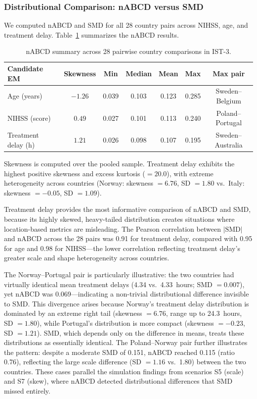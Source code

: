 \documentclass[AMA,Times1COL]{WileyNJDv5}
\begin{document}
\subsubsection{Distributional Comparison: nABCD versus SMD}\label{sec:case_b_nabcd_smd}

We computed nABCD and SMD\cite{austin2011} for all 28 country pairs across NIHSS, age, and treatment delay. Table~\ref{tab:ist3_nabcd} summarizes the nABCD results.

\begin{table}[ht]
\caption{nABCD summary across 28 pairwise country comparisons in IST-3.\label{tab:ist3_nabcd}}
\begin{tabular*}{\textwidth}{@{\extracolsep\fill}lcccccc@{}}
\toprule
\textbf{Candidate EM} & \textbf{Skewness} & \textbf{Min} & \textbf{Median} & \textbf{Mean} & \textbf{Max} & \textbf{Max pair} \\
\midrule
Age (years) & $-1.26$ & 0.039 & 0.103 & 0.123 & 0.285 & Sweden--Belgium \\
NIHSS (score) & $0.49$ & 0.027 & 0.101 & 0.113 & 0.240 & Poland--Portugal \\
Treatment delay (h) & $1.21$ & 0.026 & 0.098 & 0.107 & 0.195 & Sweden--Australia \\
\bottomrule
\end{tabular*}
\begin{tablenotes}
\item Skewness is computed over the pooled sample. Treatment delay exhibits the highest positive skewness and excess kurtosis ($= 20.0$), with extreme heterogeneity across countries (Norway: skewness $= 6.76$, SD $= 1.80$ vs.\ Italy: skewness $= -0.05$, SD $= 1.09$).
\end{tablenotes}
\end{table}

Treatment delay provides the most informative comparison of nABCD and SMD, because its highly skewed, heavy-tailed distribution creates situations where location-based metrics are misleading. The Pearson correlation between $|\text{SMD}|$ and nABCD across the 28 pairs was 0.91 for treatment delay, compared with 0.95 for age and 0.98 for NIHSS---the lower correlation reflecting treatment delay's greater scale and shape heterogeneity across countries.

The Norway--Portugal pair is particularly illustrative: the two countries had virtually identical mean treatment delays (4.34 vs.\ 4.33~hours; SMD $= 0.007$), yet nABCD was 0.069---indicating a non-trivial distributional difference invisible to SMD. This divergence arises because Norway's treatment delay distribution is dominated by an extreme right tail (skewness $= 6.76$, range up to 24.3~hours, SD $= 1.80$), while Portugal's distribution is more compact (skewness $= -0.23$, SD $= 1.21$). SMD, which depends only on the difference in means, treats these distributions as essentially identical. The Poland--Norway pair further illustrates the pattern: despite a moderate SMD of 0.151, nABCD reached 0.115 (ratio 0.76), reflecting the large scale difference (SD $= 1.16$ vs.\ 1.80) between the two countries. These cases parallel the simulation findings from scenarios S5 (scale) and S7 (skew), where nABCD detected distributional differences that SMD missed entirely.
\end{document}
